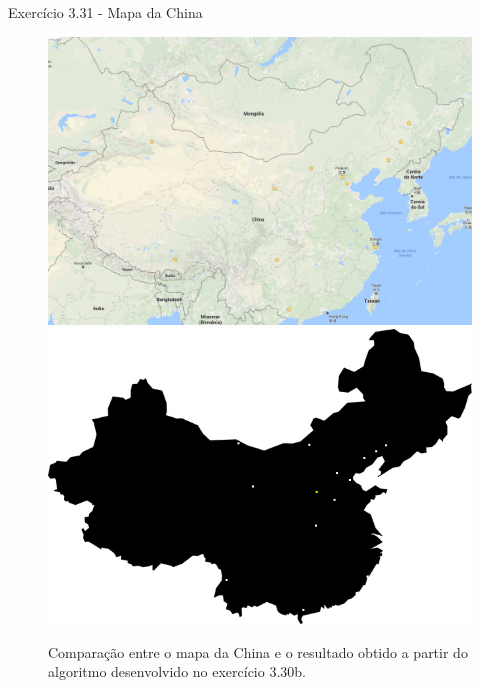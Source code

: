 \documentclass{beamer}
\begin{document}
\begin{frame}{Exerc\'icio 3.31 - Mapa da China}
  \begin{figure}
    \centering
    \includegraphics[width=0.55\columnwidth]{China_cities.png}
    \includegraphics[width=0.5\columnwidth]{China_drawn.png}
    \caption{Comparação entre o mapa da China e o resultado obtido a partir do algoritmo desenvolvido no exerc\'icio 3.30b.}
  \end{figure}
\end{frame}

\begin{frame}
  \maketitle
\end{frame}
\end{document}
